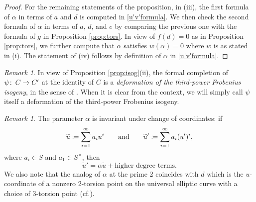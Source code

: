 \documentclass{gtpart}
\theoremstyle{definition}
\theoremstyle{remark}
\newtheorem{rmk}[thm]{Remark}
\def\co{\colon\thinspace}
\newcommand{\cf}{cf.\thinspace}
\newcommand{\Tu}{\widetilde{u}}
\newcommand{\ad}{{\rm and}}
\newcommand{\A}{\alpha}
\begin{document}
\begin{proof}
 For the remaining statements of the proposition, 
 in (iii), the first formula of $\A$ in terms of $a$ and $d$ is computed in \eqref{u'v'formula}.  
 We then check the second formula of $\A$ in terms of $a$, $d$, and $e$ by comparing the previous one with the formula of $g$ in Proposition \ref{prop:tors}.  
 In view of $f(d) = 0$ as in Proposition \ref{prop:tors}, we further compute that $\A$ satisfies $w(\A) = 0$ where $w$ is as stated in (i).  
 The statement of (iv) follows by definition of $\A$ in \eqref{u'v'formula}.  
\end{proof}

\begin{rmk}
 In view of Proposition \ref{prop:isog}\thinspace (ii), the formal completion of $\psi \co C \to C'$ at the identity of $C$ 
 is a {\em deformation of the third-power Frobenius isogeny}, in the sense of \cite[11.3]{cong}.  
 When it is clear from the context, we will simply call $\psi$ itself a deformation of the third-power Frobenius isogeny.  
\end{rmk}

\begin{rmk}
\label{rmk:alpha}
 The parameter $\A$ is invariant under change of coordinates: if 
 \[
  \Tu \coloneqq \sum_{i = 1}^\infty a_i u^i \qquad \ad \qquad \Tu' \coloneqq \sum_{i = 1}^\infty a_i (u')^i, 
 \]
 where $a_i \in S$ and $a_1 \in S^\times$, then 
 \[
  \Tu' = \A \Tu + \text{higher degree terms}.  
 \]
 We also note that the analog of $\A$ at the prime 2 coincides with $d$ 
 which is the $u$-coordinate of a nonzero 2-torsion point on the universal elliptic curve with a choice of 3-torsion point (\cf \cite[Section 3]{h2p2}).  
\end{rmk}
\end{document}
